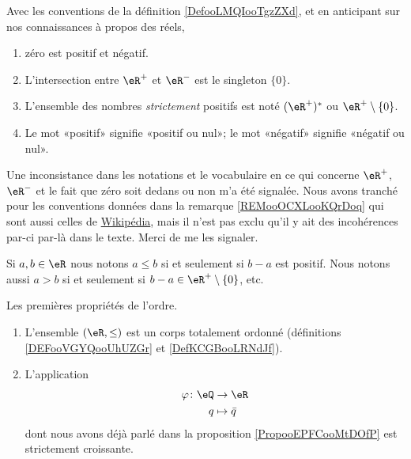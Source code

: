\begin{remark}      \label{REMooOCXLooKQrDoq}
    Avec les conventions de la définition \ref{DefooLMQIooTgzZXd}, et en anticipant sur nos connaissances à propos des réels,
    \begin{enumerate}
        \item
            zéro est positif et négatif.
        \item
            L'intersection entre \( \eR^+\) et \( \eR^-\) est le singleton \( \{ 0 \}\).
        \item
            L'ensemble des nombres \emph{strictement} positifs est noté \( (\eR^+)^*\) ou \( \eR^+\setminus\{ 0 \}\).
        \item
            Le mot «positif» signifie «positif ou nul»; le mot «négatif» signifie «négatif ou nul».
    \end{enumerate}
\end{remark}

\begin{probleme}
    Une inconsistance dans les notations et le vocabulaire en ce qui concerne \( \eR^+\), \( \eR^-\) et le fait que zéro soit dedans ou non  m'a été signalée. Nous avons tranché pour les conventions données dans la remarque \ref{REMooOCXLooKQrDoq} qui sont aussi celles de \href{https://fr.wikipedia.org/wiki/Nombre_positif}{  Wikipédia}, mais il n'est pas exclu qu'il y ait des incohérences par-ci par-là dans le texte. Merci de me les signaler. 
\end{probleme}

\begin{definition}     \label{DefooYALBooHSXZqB}
    Si \( a,b\in \eR\) nous notons \( a\leq b\) si et seulement si \( b-a\) est positif. Nous notons aussi \( a>b\) si et seulement si \( b-a\in \eR^+\setminus\{ 0 \}\), etc.
\end{definition}

\begin{lemma}       \label{LemooRordonne}
    Les premières propriétés de l'ordre.
    \begin{enumerate}
        \item
            L'ensemble \( (\eR,\leq)\) est un corps totalement ordonné (définitions \ref{DEFooVGYQooUhUZGr} et \ref{DefKCGBooLRNdJf}).
        \item
            L'application 
            \begin{equation}
                \begin{aligned}
                    \varphi\colon \eQ&\to \eR \\
                    q&\mapsto \bar q 
                \end{aligned}
            \end{equation}
            dont nous avons déjà parlé dans la proposition \ref{PropooEPFCooMtDOfP} est strictement croissante.
    \end{enumerate}
\end{lemma}

